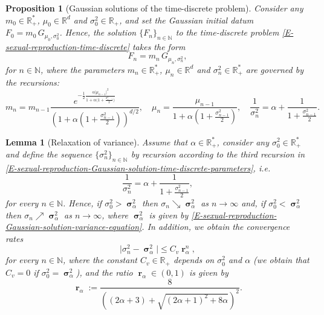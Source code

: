 \documentclass[reqno]{amsart}
\newtheorem{lemma}[definition]{Lemma}
\newtheorem{proposition}[definition]{Proposition}
\DeclareMathOperator{\bsigma}{\boldsymbol{\sigma}}
\DeclareMathOperator{\br}{\boldsymbol{r}}
\numberwithin{equation}{section}
\begin{document}
{\begin{proposition}[Gaussian solutions of the time-discrete problem]\label{P-sexual-reproduction-Gaussian-solution-time-discrete}
Consider any $m_0\in \mathbb{R}_+^*$, $\mu_0\in \mathbb{R}^d$ and $\sigma_0^2\in \mathbb{R}_+$, and set the Gaussian initial datum $F_0=m_0\,G_{\mu_0,\sigma_0^2}$. Hence, the solution $\{F_n\}_{n\in \mathbb{N}}$ to the time-discrete problem \eqref{E-sexual-reproduction-time-discrete} takes the form
\begin{equation}\label{E-sexual-reproduction-Gaussian-solution-time-discrete}
F_n=m_n\,G_{\mu_n,\sigma_n^2},
\end{equation}
for $n\in \mathbb{N}$, where the parameters $m_n\in \mathbb{R}_+^*$, $\mu_n\in \mathbb{R}^d$ and $\sigma_n^2\in \mathbb{R}_+^*$ are governed by the recursions:
\begin{equation}\label{E-sexual-reproduction-Gaussian-solution-time-discrete-parameters}
m_n=m_{n-1}\frac{e^{-\frac{1}{2}\frac{\alpha\vert \mu_{n-1}\vert^2}{1+\alpha\big(1+\frac{\sigma_{n-1}^2}{2}\big)}}}{(1+\alpha(1+\frac{\sigma_{n-1}^2}{2}))^{d/2}},\quad \mu_n=\frac{\mu_{n-1}}{1+\alpha(1+\frac{\sigma^2_{n-1}}{2})}, \quad \frac{1}{\sigma_n^2}=\alpha+\frac{1}{1+\frac{\sigma_{n-1}^2}{2}}.
\end{equation}
\end{proposition}

\begin{lemma}[Relaxation of variance]\label{L-sexual-reproduction-Gaussian-solution-time-discrete-variance-relaxation}
Assume that $\alpha\in \mathbb{R}_+^*$, consider any $\sigma_0^2\in \mathbb{R}_+^*$ and define the sequence $\{\sigma_n^2\}_{n\in \mathbb{N}}$ by recursion according to the third recursion in \eqref{E-sexual-reproduction-Gaussian-solution-time-discrete-parameters}, {\em i.e.}
\begin{equation}\label{E-sexual-reproduction-Gaussian-solution-time-discrete-variance-recursion}
\frac{1}{\sigma_n^2}=\alpha+\frac{1}{1+\frac{\sigma_{n-1}^2}{2}},
\end{equation}
for every $n\in \mathbb{N}$. Hence, if $\sigma_0^2>\bsigma_\alpha^2$ then $\sigma_n\searrow \bsigma_\alpha^2$ as $n\rightarrow\infty$ and, if $\sigma_0^2<\bsigma_\alpha^2$ then $\sigma_n\nearrow \bsigma_\alpha^2$ as $n\rightarrow\infty$, where $\bsigma_\alpha^2$ is given by \eqref{E-sexual-reproduction-Gaussian-solution-variance-equation}. In addition, we obtain the convergence rates
\begin{equation}\label{E-sexual-reproduction-Gaussian-solution-time-discrete-variance-relaxation}
\vert \sigma_n^2-\bsigma_\alpha^2\vert\leq C_v \br_\alpha^n,
\end{equation}
for every $n\in \mathbb{N}$, where the constant $C_v\in\mathbb{R}_+$ depends on $\sigma_0^2$ and $\alpha$ (we obtain that $C_v=0$ if $\sigma_0^2=\bsigma_\alpha^2$), and the ratio $\br_\alpha\in (0,1)$ is given by
\begin{equation}\label{E-variance-contraction-ralpha}
\br_\alpha:=\frac{8}{\left((2\alpha+3)+\sqrt{(2\alpha+1)^2+8\alpha}\right)^2}.
\end{equation}
\end{lemma}

}
\end{document}
